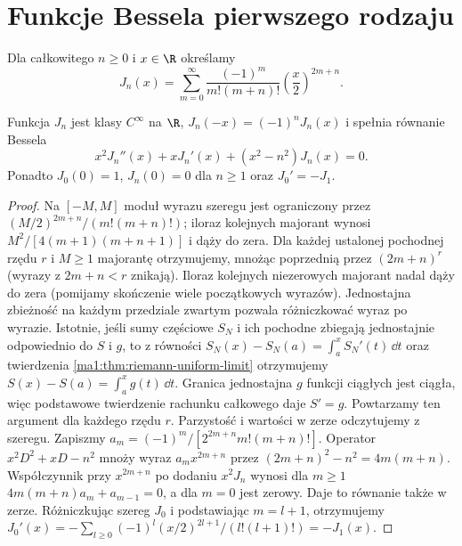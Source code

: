 \section{Funkcje Bessela pierwszego rodzaju}
\begin{definicja}
\label{ma1:def:bessel-j}
Dla całkowitego $n\ge0$ i $x\in\R$ określamy
\[
 J_n(x)=\sum_{m=0}^\infty
 \frac{(-1)^m}{m!(m+n)!}\left(\frac x2\right)^{2m+n}.
\]
\end{definicja}
\begin{twierdzenie}
\label{ma1:thm:bessel-j-ode}
Funkcja $J_n$ jest klasy $C^\infty$ na $\R$,
$J_n(-x)=(-1)^nJ_n(x)$ i spełnia równanie Bessela
\[
 x^2J_n''(x)+xJ_n'(x)+(x^2-n^2)J_n(x)=0.
\]
Ponadto $J_0(0)=1$, $J_n(0)=0$ dla $n\ge1$
oraz $J_0'=-J_1$.
\end{twierdzenie}
\begin{proof}
Na $[-M,M]$ moduł wyrazu szeregu jest ograniczony
przez $(M/2)^{2m+n}/(m!(m+n)!)$; iloraz kolejnych
majorant wynosi $M^2/[4(m+1)(m+n+1)]$ i dąży do zera.
Dla każdej ustalonej pochodnej rzędu $r$ i $M\ge1$
majorantę otrzymujemy, mnożąc poprzednią przez
$(2m+n)^r$ (wyrazy z $2m+n<r$ znikają).
Iloraz kolejnych niezerowych majorant nadal dąży
do zera (pomijamy skończenie wiele początkowych
wyrazów). Jednostajna zbieżność na każdym przedziale
zwartym pozwala różniczkować wyraz po wyrazie.
Istotnie, jeśli sumy częściowe $S_N$ i ich pochodne
zbiegają jednostajnie odpowiednio do $S$ i $g$,
to z równości
$S_N(x)-S_N(a)=\int_a^x S_N'(t)\,\dd t$
oraz twierdzenia \ref{ma1:thm:riemann-uniform-limit}
otrzymujemy $S(x)-S(a)=\int_a^x g(t)\,\dd t$.
Granica jednostajna $g$ funkcji ciągłych jest ciągła,
więc podstawowe twierdzenie rachunku całkowego
daje $S'=g$. Powtarzamy ten argument dla każdego
rzędu $r$.
Parzystość i wartości w zerze odczytujemy z szeregu.
Zapiszmy $a_m=(-1)^m/[2^{2m+n}m!(m+n)!]$.
Operator $x^2D^2+xD-n^2$ mnoży wyraz $a_mx^{2m+n}$
przez $(2m+n)^2-n^2=4m(m+n)$. Współczynnik
przy $x^{2m+n}$ po dodaniu $x^2J_n$ wynosi dla $m\ge1$
$4m(m+n)a_m+a_{m-1}=0$, a dla $m=0$ jest zerowy.
Daje to równanie także w zerze. Różniczkując szereg
$J_0$ i podstawiając $m=l+1$, otrzymujemy
$J_0'(x)=-\sum_{l\ge0}(-1)^l(x/2)^{2l+1}/(l!(l+1)!)=-J_1(x)$.
\end{proof}

